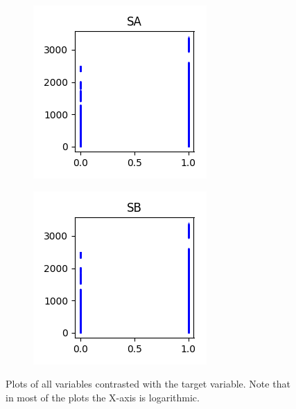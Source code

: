 \documentclass[sigconf,authorversion]{acmart}
\begin{document}
\begin{figure}[htb]\ContinuedFloat
    \centering
    \begin{subfigure}[b]{0.3\textwidth}
        \includegraphics[width=\textwidth]{img/SA.png}
        \label{fig:sa}
    \end{subfigure}
    \begin{subfigure}[b]{0.3\textwidth}
        \includegraphics[width=\textwidth]{img/SB.png}
        \label{fig:sb}
    \end{subfigure}
    \caption{Plots of all variables contrasted with the target variable. Note that in most of the plots the X-axis is logarithmic.}
    \label{fig:plots}
\end{figure}
\end{document}
